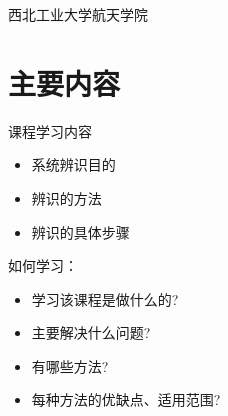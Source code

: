 

\def\lecturename{系统辨识}

\title{\insertlecture}

\author{邢超}

\institute
{
  西北工业大学航天学院
}


\subtitle{系统辨识基本概念}
\date{2012}



\begin{frame}
  \maketitle
\end{frame}





\section{主要内容}

\begin{frame}{课程学习内容}
\begin{itemize}
\item 系统辨识目的
\item 辨识的方法
\item 辨识的具体步骤
\end{itemize}
如何学习：
\begin{itemize}
\item 学习该课程是做什么的?
\item 主要解决什么问题?
\item 有哪些方法?
\item 每种方法的优缺点、适用范围?
\end{itemize}
\end{frame}

